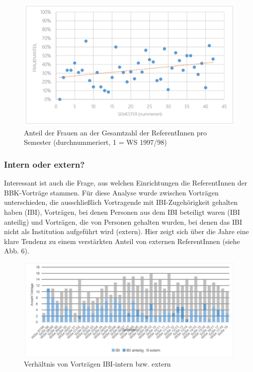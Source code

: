\documentclass[a4paper,
fontsize=11pt,
oneside,
numbers=noperiodatend,
parskip=half-,
bibliography=totoc,
final
]{scrartcl}
\begin{document}
\begin{figure}
\centering
\includegraphics[width=12cm]{img/Abbildung5.png}
\caption{Anteil der Frauen an der Gesamtzahl der ReferentInnen pro
Semester (durchnummeriert, 1 = WS 1997/98)}
\end{figure}

\hypertarget{intern-oder-extern}{%
\subsubsection{Intern oder extern?}\label{intern-oder-extern}}

Interessant ist auch die Frage, aus welchen Einrichtungen die
ReferentInnen der BBK-Vorträge stammen. Für diese Analyse wurde zwischen
Vorträgen unterschieden, die ausschließlich Vortragende mit
IBI-Zugehörigkeit gehalten haben (IBI), Vorträgen, bei denen Personen
aus dem IBI beteiligt waren (IBI anteilig) und Vorträgen, die von
Personen gehalten wurden, bei denen das IBI nicht als Institution
aufgeführt wird (extern). Hier zeigt sich über die Jahre eine klare
Tendenz zu einem verstärkten Anteil von externen ReferentInnen (siehe
Abb. 6).

\begin{figure}
\centering
\includegraphics[width=15cm]{img/Abbildung6.JPG}
\caption{Verhältnis von Vorträgen IBI-intern bzw. extern}
\end{figure}
\end{document}
